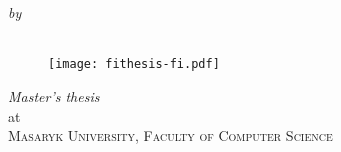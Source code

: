 \begin{titlepage}
  \vspace*{5cm}
  \makeatletter
  \begin{center}
    \begin{Huge}
      \@title
    \end{Huge}\\[0.1cm]
    \begin{Large}
      \@subtitle
    \end{Large}\\
    \emph{by}\\
    \@author\\
    \hfill
    \begin{figure}[h]
      \centering
      \texttt{[image: fithesis-fi.pdf]}
    \end{figure}

    \vfill
    \emph{Master's thesis}\\
    at\\
    \textsc{Masaryk University, Faculty of Computer Science}
  \end{center}
  \makeatother
\end{titlepage}

\newpage
\null
\thispagestyle{empty}
\newpage
